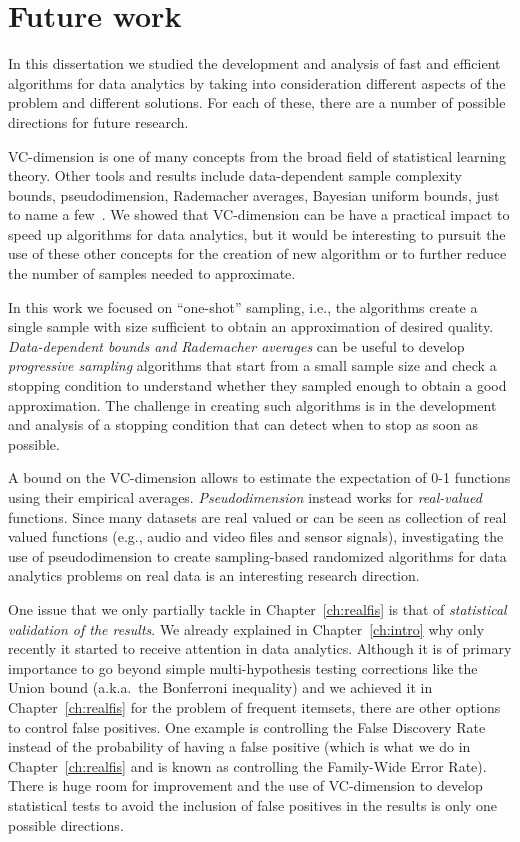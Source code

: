 \section*{Future work} 
In this dissertation we studied the development and analysis of fast and
efficient algorithms for data analytics by taking into consideration different
aspects of the problem and different solutions. For each of these, there are a
number of possible directions for future research.

VC-dimension is one of many concepts from the broad field of statistical
learning theory. Other tools and results include data-dependent sample
complexity bounds, pseudodimension, Rademacher averages, Bayesian uniform
bounds, just to name a few~\citep{BoucheronBL05,AnthonyB99,DevroyeGL96}. We
showed that VC-dimension can be have a practical impact to speed up algorithms
for data analytics, but it would be interesting to pursuit the use of these
other concepts for the creation of new algorithm or to further reduce the number
of samples needed to approximate. 

In this work we focused on ``one-shot'' sampling, i.e., the algorithms create a
single sample with size sufficient to obtain an approximation of desired
quality. \emph{Data-dependent bounds and Rademacher averages} can be
useful to develop \emph{progressive sampling} algorithms that start from a small
sample size and check a stopping condition to understand whether they sampled
enough to obtain a good approximation. The challenge in creating such algorithms
is in the development and analysis of a stopping condition that can detect when
to stop as soon as possible.  

A bound on the VC-dimension allows to estimate the expectation of 0-1 functions
using their empirical averages. \emph{Pseudodimension} instead works for
\emph{real-valued} functions. Since many datasets are real valued or can be seen
as collection of real valued functions (e.g., audio and video files and sensor
signals), investigating the use of pseudodimension to create sampling-based
randomized algorithms for data analytics problems on real data is an interesting
research direction.

One issue that we only partially tackle in Chapter~\ref{ch:realfis} is that of
\emph{statistical validation of the results}. We already explained in
Chapter~\ref{ch:intro} why only recently it started to receive attention in data
analytics. Although it is of primary importance to go beyond
simple multi-hypothesis testing corrections like the Union bound (a.k.a.~the
Bonferroni inequality) and we achieved it in Chapter~\ref{ch:realfis} for the
problem of frequent itemsets, there are other options to control false
positives. One example is controlling the False Discovery
Rate~\citep{BenjiaminiH95} instead of the probability of having a false positive
(which is what we do in Chapter~\ref{ch:realfis} and is known as controlling the
Family-Wide Error Rate). There is huge room for improvement and the use of
VC-dimension to develop statistical tests to avoid the inclusion of false
positives in the results is only one possible directions. 

